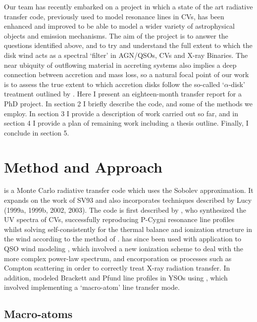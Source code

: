 \documentclass[useAMS,usenatbib,onecolumn]{mn2e2}
\begin{document}
Our team has recently embarked on a project in which a state of the art radiative transfer code, previously
used to model resonance lines in CVs, has been enhanced and improved to be able to model a wider variety of astrophysical
objects and emission mechanisms. The aim of the project is to answer the questions identified above, and to try and understand the
full extent to which the disk wind acts as a spectral `filter' in AGN/QSOs, CVs and X-ray Binaries.
The near ubiquity of outflowing material in accreting systems also implies a deep connection
between accretion and mass loss, so a natural focal point of our work is to assess
the true extent to which accretion disks follow the so-called `$\alpha$-disk' treatment
outlined by \cite{shakurasunyaev1973}. 
Here I present an eighteen-month transfer report for a PhD project. In section 2 I briefly describe the code, 
and some of the methods we employ. In section 3 I provide a description of work carried out so far, and in section 4 I provide a 
plan of remaining work including a thesis outline. Finally, I conclude in section 5.






%
%
\section{Method and Approach}

\py is a Monte Carlo radiative transfer code which uses the Sobolev approximation.  
It expands on the work of SV93 and also incorporates techniques described by
Lucy (1999a, 1999b, 2002, 2003). The code is first described by \cite{LK02},
who synthesized the UV spectra of CVs, successfully reproducing P-Cygni resonance line profiles
whilst solving self-consistently for the thermal balance and ionization structure in the wind
according to the method of \cite{LM93}. \py has since been used with application
to QSO wind modeling \citep{higginbottom2013}, which involved a new ionization scheme to deal with the
more complex power-law spectrum, and encorporation os processes such as Compton scattering in order
to correctly treat X-ray radiation transfer. In addition, \cite{simmacro2005} modeled
Brackett and Pfund line profiles in YSOs using \py, which involved
implementing a `macro-atom' line transfer mode.


\subsection{Macro-atoms}
\end{document}
